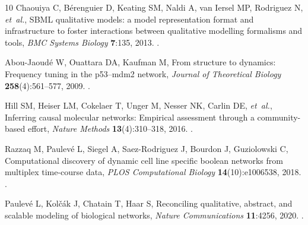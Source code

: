 \documentclass{ws-jbcb}
\numberwithin{equation}{section}
\begin{document}
\begin{thebibliography}{10}
Chaouiya C, B\'erenguier D, Keating SM, Naldi A, van Iersel MP, Rodriguez N,
  \emph{et~al.}, {SBML} qualitative models: a model representation format and
  infrastructure to foster interactions between qualitative modelling
  formalisms and tools, \emph{BMC Systems Biology} \textbf{7}:135, 2013.
\newblock {}.

Abou-Jaoud\'e W, Ouattara DA, Kaufman M, From structure to dynamics: Frequency
  tuning in the p53--mdm2 network, \emph{Journal of Theoretical Biology}
  \textbf{258}(4):561--577, 2009.
\newblock {}.

Hill SM, Heiser LM, Cokelaer T, Unger M, Nesser NK, Carlin DE, \emph{et~al.},
  Inferring causal molecular networks: Empirical assessment through a
  community-based effort, \emph{Nature Methods} \textbf{13}(4):310--318, 2016.
\newblock {}.

Razzaq M, Paulev{\'e} L, Siegel A, Saez-Rodriguez J, Bourdon J, Guziolowski C,
  Computational discovery of dynamic cell line specific boolean networks from
  multiplex time-course data, \emph{PLOS Computational Biology}
  \textbf{14}(10):e1006538, 2018.
\newblock {}.

Paulev{\'e} L, Kol{\v{c}}{\'a}k J, Chatain T, Haar S, Reconciling qualitative,
  abstract, and scalable modeling of biological networks, \emph{Nature
  Communications} \textbf{11}:4256, 2020.
\newblock {}.

\end{thebibliography}
\end{document}
